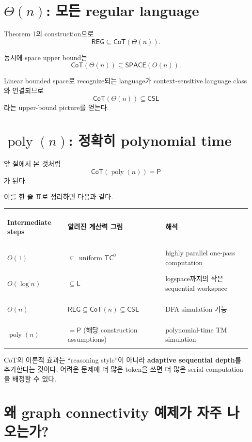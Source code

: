 \documentclass[11pt,a4paper,oneside,openany]{memoir}
\theoremstyle{definition}
\newcommand{\poly}{\operatorname{poly}}
\newcommand{\SPACE}{\mathsf{SPACE}}
\newcommand{\TC}{\mathsf{TC}}
\newcommand{\Reg}{\mathsf{REG}}
\newcommand{\CSL}{\mathsf{CSL}}
\newcommand{\CoT}{\mathsf{CoT}}
\newcommand{\Lclass}{\mathsf{L}}
\newcommand{\Pclass}{\mathsf{P}}
\begin{document}
\section{\texorpdfstring{$\Theta(n)$: 모든 regular language}{Theta(n): 모든 regular language}}

Theorem 1의 construction으로
\[
\Reg\subseteq\CoT(\Theta(n)).
\]

동시에 space upper bound는
\[
\CoT(\Theta(n))\subseteq\SPACE(O(n)).
\]

Linear bounded space로 recognize되는 language가 context-sensitive language class와 연결되므로
\[
\CoT(\Theta(n))\subseteq\CSL
\]
라는 upper-bound picture를 얻는다.

\section{\texorpdfstring{$\poly(n)$: 정확히 polynomial time}{poly(n): 정확히 polynomial time}}

앞 절에서 본 것처럼
\[
\CoT(\poly(n))=\Pclass
\]
가 된다.

이를 한 줄 표로 정리하면 다음과 같다.

\begin{center}
\small
\begin{tabularx}{\textwidth}{>{\bfseries\raggedright\arraybackslash}p{}Y Y}
\toprule
Intermediate steps & 알려진 계산력 그림 & 해석 \\
\midrule
$O(1)$ & $\subseteq$ uniform $\TC^0$ & highly parallel one-pass computation \\
$O(\log n)$ & $\subseteq \Lclass$ & logspace까지의 작은 sequential workspace \\
$\Theta(n)$ & $\Reg\subseteq\CoT(n)\subseteq\CSL$ & DFA simulation 가능 \\
$\poly(n)$ & $=\Pclass$ (해당 construction assumptions) & polynomial-time TM simulation \\
\bottomrule
\end{tabularx}
\end{center}

\begin{keybox}
CoT의 이론적 효과는 ``reasoning style''이 아니라 \textbf{adaptive sequential depth}를 추가한다는 것이다. 어려운 문제에 더 많은 token을 쓰면 더 많은 serial computation을 배정할 수 있다.
\end{keybox}

\section{왜 graph connectivity 예제가 자주 나오는가?}
\end{document}
